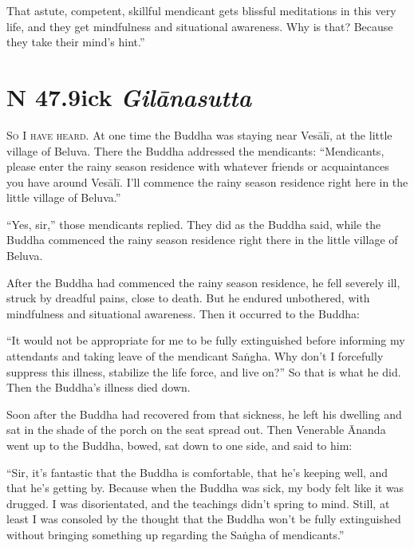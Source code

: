 \documentclass[12pt,openany]{book}%
\newcommand*{\suttatitleacronym}[1]{\smaller[2]{#1}\vspace*{.3em}}
\newcommand*{\suttatitletranslation}[1]{\linebreak{#1}}
\newcommand*{\suttatitleroot}[1]{\linebreak\smaller[2]\itshape{#1}}
\newcommand*{\tocacronym}[1]{\hspace*{-3.3em}{#1}\quad}
\newcommand*{\toctranslation}[1]{#1}
\newcommand*{\tocroot}[1]{(\textit{#1})}
\newcommand*{\scevam}[1]{\textsc{#1}}
\begin{document}
That astute, competent, skillful mendicant gets blissful meditations in this very life, and they get mindfulness and situational awareness. Why is that? Because they take their mind’s hint.” 

%
\section*{{\suttatitleacronym SN 47.9}{\suttatitletranslation Sick }{\suttatitleroot Gilānasutta}}
\addcontentsline{toc}{section}{\tocacronym{SN 47.9} \toctranslation{Sick } \tocroot{Gilānasutta}}

\scevam{So I have heard. }At one time the Buddha was staying near \textsanskrit{Vesālī}, at the little village of Beluva. There the Buddha addressed the mendicants: “Mendicants, please enter the rainy season residence with whatever friends or acquaintances you have around \textsanskrit{Vesālī}. I’ll commence the rainy season residence right here in the little village of Beluva.” 

“Yes, sir,” those mendicants replied. They did as the Buddha said, while the Buddha commenced the rainy season residence right there in the little village of Beluva. 

After the Buddha had commenced the rainy season residence, he fell severely ill, struck by dreadful pains, close to death. But he endured unbothered, with mindfulness and situational awareness. Then it occurred to the Buddha: 

“It would not be appropriate for me to be fully extinguished before informing my attendants and taking leave of the mendicant \textsanskrit{Saṅgha}. Why don’t I forcefully suppress this illness, stabilize the life force, and live on?” So that is what he did. Then the Buddha’s illness died down. 

Soon after the Buddha had recovered from that sickness, he left his dwelling and sat in the shade of the porch on the seat spread out. Then Venerable Ānanda went up to the Buddha, bowed, sat down to one side, and said to him: 

“Sir, it’s fantastic that the Buddha is comfortable, that he’s keeping well, and that he’s getting by. Because when the Buddha was sick, my body felt like it was drugged. I was disorientated, and the teachings didn’t spring to mind. Still, at least I was consoled by the thought that the Buddha won’t be fully extinguished without bringing something up regarding the \textsanskrit{Saṅgha} of mendicants.” 
\end{document}
